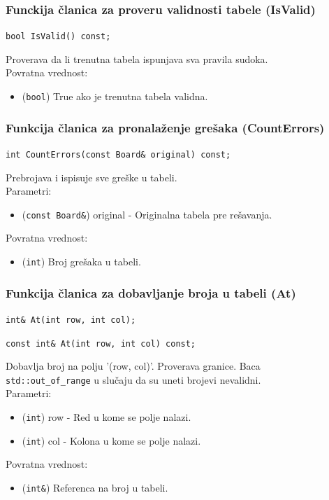 \documentclass[a4paper]{article}
\begin{document}
    \subsubsection{Funckija članica za proveru validnosti tabele (IsValid)}
    \texttt{bool IsValid() const;}
    \par Proverava da li trenutna tabela ispunjava sva pravila sudoka.\\
    Povratna vrednost:
    \begin{itemize}
        \item (\texttt{bool}) True ako je trenutna tabela validna.
    \end{itemize}

    \subsubsection{Funkcija članica za pronalaženje grešaka (CountErrors)}
    \texttt{int CountErrors(const Board\& original) const;}
    \par Prebrojava i ispisuje sve greške u tabeli.\\
    Parametri:
    \begin{itemize}
        \item (\texttt{const Board\&}) original - Originalna tabela pre rešavanja.
    \end{itemize}
    Povratna vrednost:
    \begin{itemize}
        \item (\texttt{int}) Broj grešaka u tabeli.
    \end{itemize}

    \subsubsection{Funkcija članica za dobavljanje broja u tabeli (At)}
    \texttt{int\& At(int row, int col);}
    \par\texttt{const int\& At(int row, int col) const;}
    \par Dobavlja broj na polju '(row, col)'. Proverava granice. Baca \\ \texttt{std::out\_of\_range} u slučaju da
    su uneti brojevi nevalidni.\\
    Parametri:
    \begin{itemize}
        \item (\texttt{int}) row - Red u kome se polje nalazi.
        \item (\texttt{int}) col - Kolona u kome se polje nalazi.
    \end{itemize}
    Povratna vrednost:
    \begin{itemize}
        \item (\texttt{int\&}) Referenca na broj u tabeli.
    \end{itemize}
    
\end{document}
